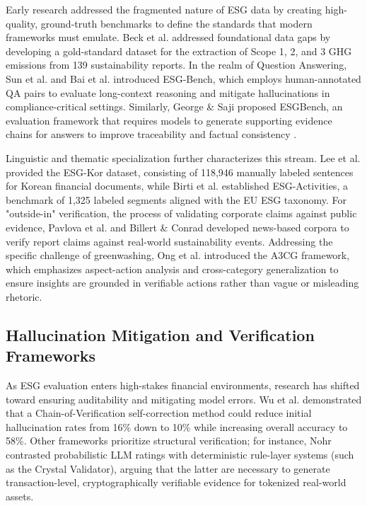 \documentclass[english, online, cse, master]{dithesis}
\begin{document}
Early research addressed the fragmented nature of ESG data by creating high-quality, ground-truth benchmarks to define the standards that modern frameworks must emulate. Beck et al.  \parencite{jacob_beck_9548a833} addressed foundational data gaps by developing a gold-standard dataset for the extraction of Scope 1, 2, and 3 GHG emissions from 139 sustainability reports. In the realm of Question Answering, Sun et al.  \parencite{siqi_sun_f6a51152} and Bai et al.  \parencite{association_for_artificial_intelligence_2026_86e12eae} introduced ESG-Bench, which employs human-annotated QA pairs to evaluate long-context reasoning and mitigate hallucinations in compliance-critical settings. Similarly, George \& Saji  \parencite{s__s__george_saji_b30d4b3e} proposed ESGBench, an evaluation framework that requires models to generate supporting evidence chains for answers to improve traceability and factual consistency  \parencite{s__s__george_saji_b30d4b3e}.

Linguistic and thematic specialization further characterizes this stream. Lee et al.  \parencite{jaeyoung_lee_1894333c} provided the ESG-Kor dataset, consisting of 118,946 manually labeled sentences for Korean financial documents, while Birti et al.  \parencite{mattia_birti_c097e3e8} established ESG-Activities, a benchmark of 1,325 labeled segments aligned with the EU ESG taxonomy. For "outside-in" verification, the process of validating corporate claims against public evidence, Pavlova et al.  \parencite{mariya_pavlova_259be499} and Billert \& Conrad  \parencite{fabian_billert_a5fbb687} developed news-based corpora to verify report claims against real-world sustainability events. Addressing the specific challenge of greenwashing, Ong et al.  \parencite{keane_ong_0a5de439} introduced the A3CG framework, which emphasizes aspect-action analysis and cross-category generalization to ensure insights are grounded in verifiable actions rather than vague or misleading rhetoric.
\subsection{Hallucination Mitigation and Verification Frameworks}

As ESG evaluation enters high-stakes financial environments, research has shifted toward ensuring auditability and mitigating model errors. Wu et al.  \parencite{yue_wu_cae353aa} demonstrated that a Chain-of-Verification self-correction method could reduce initial hallucination rates from 16\% down to 10\% while increasing overall accuracy to 58\%. Other frameworks prioritize structural verification; for instance, Nohr  \parencite{steven_paul_nohr_a6874924} contrasted probabilistic LLM ratings with deterministic rule-layer systems (such as the Crystal Validator), arguing that the latter are necessary to generate transaction-level, cryptographically verifiable evidence for tokenized real-world assets.
\end{document}
